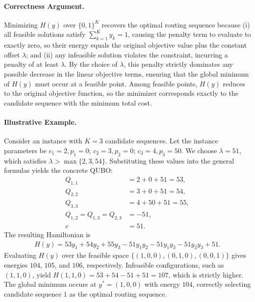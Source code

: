 \documentclass[12pt]{article}
\begin{document}
\paragraph{Correctness Argument.}
Minimizing $H(y)$ over $\{0,1\}^K$ recovers the optimal routing sequence because (i) all feasible solutions satisfy $\sum_{k=1}^{K} y_k = 1$, causing the penalty term to evaluate to exactly zero, so their energy equals the original objective value plus the constant offset $\lambda$; and (ii) any infeasible solution violates the constraint, incurring a penalty of at least $\lambda$. By the choice of $\lambda$, this penalty strictly dominates any possible decrease in the linear objective terms, ensuring that the global minimum of $H(y)$ must occur at a feasible point. Among feasible points, $H(y)$ reduces to the original objective function, so the minimizer corresponds exactly to the candidate sequence with the minimum total cost.

\paragraph{Illustrative Example.}
Consider an instance with $K=3$ candidate sequences. Let the instance parameters be $c_1 = 2, p_1 = 0$; $c_2 = 3, p_2 = 0$; $c_3 = 4, p_3 = 50$. We choose $\lambda = 51$, which satisfies $\lambda > \max\{2, 3, 54\}$. Substituting these values into the general formulas yields the concrete QUBO:
\begin{align}
Q_{1,1} &= 2 + 0 + 51 = 53, \\
Q_{2,2} &= 3 + 0 + 51 = 54, \\
Q_{3,3} &= 4 + 50 + 51 = 55, \\
Q_{1,2} = Q_{1,3} = Q_{2,3} &= -51, \\
c &= 51.
\end{align}
The resulting Hamiltonian is
\begin{align}
H(y) = 53 y_1 + 54 y_2 + 55 y_3 - 51 y_1 y_2 - 51 y_1 y_3 - 51 y_2 y_3 + 51.
\end{align}
Evaluating $H(y)$ over the feasible space $\{(1,0,0), (0,1,0), (0,0,1)\}$ gives energies $104$, $105$, and $106$, respectively. Infeasible configurations, such as $(1,1,0)$, yield $H(1,1,0) = 53 + 54 - 51 + 51 = 107$, which is strictly higher. The global minimum occurs at $y^* = (1,0,0)$ with energy $104$, correctly selecting candidate sequence $1$ as the optimal routing sequence.
\end{document}
